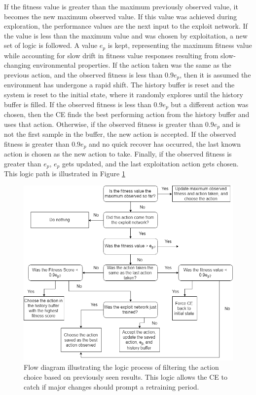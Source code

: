 \par If the fitness value is greater than the maximum previously observed value, it becomes the new maximum observed value. If this value was achieved during exploration, the performance values are the next input to the exploit network. If the value is less than the maximum value and was chosen by exploitation, a new set of logic is followed. A value $e_p$ is kept, representing the maximum fitness value while accounting for slow drift in fitness value responses resulting from slow-changing environmental properties. If the action taken was the same as the previous action, and the observed fitness is less than $0.9 e_p$, then it is assumed the environment has undergone a rapid shift. The history buffer is reset and the system is reset to the initial state, where it randomly explores until the history buffer is filled.  If the observed fitness is less than $0.9 e_p$ but a different action was chosen, then the CE finds the best performing action from the history buffer and uses that action. Otherwise, if the observed fitness is greater than $0.9 e_p$ and is not the first sample in the buffer, the new action is accepted. If the observed fitness is greater than $0.9 e_p$ and no quick recover has occurred, the last known action is chosen as the new action to take. Finally, if the observed fitness is greater than $e_p$, $e_p$ gets updated, and the last exploitation action gets chosen. This logic path is illustrated in Figure \ref{fig:action_acceptance_protocol} 


\begin{figure}[ht]
\includegraphics[width=\textwidth]{figures/action_acceptance_protocol.png}
\caption{Flow diagram illustrating the logic process of filtering the action choice based on previously seen results. This logic allows the CE to catch if major changes should prompt a retraining period.}\label{fig:action_acceptance_protocol}
\end{figure}

